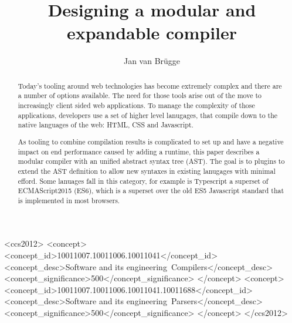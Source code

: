 \documentclass[sigconf, authorversion]{acmart}
\begin{document}
\title{Designing a modular and expandable compiler}

\author{Jan van Br\"ugge}

\begin{abstract}
Today's tooling around web technologies has become extremely complex and there are a number of options available. The need for those tools arise out of the move to increasingly client sided web applications. To manage the complexity of those applications, developers use a set of higher level lanugages, that compile down to the native languages of the web: HTML, CSS and Javascript.

    As tooling to combine compilation results is complicated to set up and have a negative impact on end performance caused by adding a runtime, this paper describes a modular compiler with an unified abstract syntax tree (AST). The goal is to plugins to extend the AST definition to allow new syntaxes in existing lanugages with minimal efford. Some lanuages fall in this category, for example is Typescript a superset of ECMAScript2015 (ES6), which is a superset over the old ES5 Javascript standard that is implemented in most browsers.
\end{abstract}

%
%
\begin{CCSXML}
<ccs2012>
<concept>
<concept_id>10011007.10011006.10011041</concept_id>
<concept_desc>Software and its engineering~Compilers</concept_desc>
<concept_significance>500</concept_significance>
</concept>
<concept>
<concept_id>10011007.10011006.10011041.10011688</concept_id>
<concept_desc>Software and its engineering~Parsers</concept_desc>
<concept_significance>500</concept_significance>
</concept>
</ccs2012>
\end{CCSXML}





\maketitle




 
\end{document}

